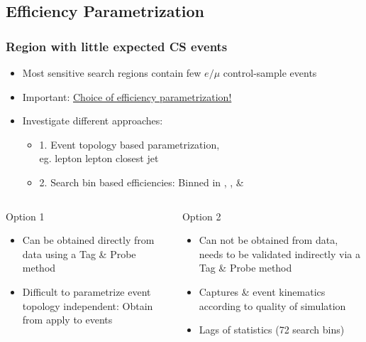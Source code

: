 \documentclass{beamer}
\begin{document}
\subsection{Efficiency Parametrization}
\begin{frame}
 \frametitle{Region with little expected CS events}
 \begin{itemize}
  \item Most sensitive search regions contain few $e/\mu$ control-sample events
  \item Important: \underline{Choice of efficiency parametrization!}
  \item Investigate different approaches:
  \begin{itemize}
   \item 1. Event topology based parametrization,\\ eg. \pt lepton \deltaR lepton closest jet
   \item 2. Search bin based efficiencies: Binned in \HT, \MHT, \NJets \& \BTags
  \end{itemize}
 \end{itemize}
 \noindent\makebox[\linewidth]{\rule{\textwidth}{0.4pt}}
 \begin{columns}
  \begin{column}{0.465\textwidth}
  Option 1
   \begin{itemize}
    \item Can be obtained directly from data using a Tag \& Probe method
    \item Difficult to parametrize event topology independent: Obtain from \Zll apply to \ttbar \wpj events
   \end{itemize}

  \end{column}
  \begin{column}{0.535\textwidth}
     Option 2
   \begin{itemize}
    \item Can not be obtained from data, needs to be validated indirectly via a Tag \& Probe method
    \item Captures \ttbar \& \wpj event kinematics according to quality of simulation
    \item Lags of statistics (72 search bins)
   \end{itemize}
  \end{column}

 \end{columns}
\end{frame}
\end{document}

